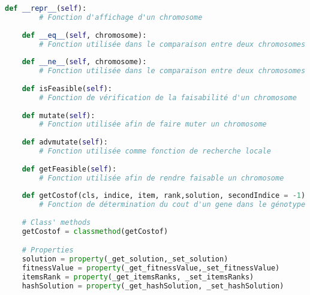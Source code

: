 \begin{lstlisting}[language=python]
	def __repr__(self):
		# Fonction d'affichage d'un chromosome
	
	def __eq__(self, chromosome):
		# Fonction utilisée dans le comparaison entre deux chromosomes
	
	def __ne__(self, chromosome):
		# Fonction utilisée dans le comparaison entre deux chromosomes
	
	def isFeasible(self):
		# Fonction de vérification de la faisabilité d'un chromosome
	
	def mutate(self):
		# Fonction utilisée afin de faire muter un chromosome
	
	def advmutate(self):
		# Fonction utilisée comme fonction de recherche locale
	
	def getFeasible(self):
		# Fonction utilisée afin de rendre faisable un chromosome
	
	def getCostof(cls, indice, item, rank,solution, secondIndice = -1):
		# Fonction de détermination du cout d'un gene dans le génotype d'un chromosome
	
	# Class' methods
	getCostof = classmethod(getCostof)

	# Properties
	solution = property(_get_solution,_set_solution)
	fitnessValue = property(_get_fitnessValue,_set_fitnessValue)
	itemsRank = property(_get_itemsRanks, _set_itemsRanks)
	hashSolution = property(_get_hashSolution, _set_hashSolution) 

    \end{lstlisting}
    
